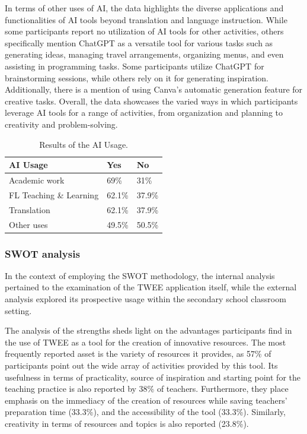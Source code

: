In terms of other uses of AI, the data highlights the diverse
applications and functionalities of AI tools beyond translation and
language instruction. While some participants report no utilization of
AI tools for other activities, others specifically mention ChatGPT as a
versatile tool for various tasks such as generating ideas, managing
travel arrangements, organizing menus, and even assisting in programming
tasks. Some participants utilize ChatGPT for brainstorming sessions,
while others rely on it for generating inspiration. Additionally, there
is a mention of using Canva's automatic generation
feature for creative tasks. Overall, the data showcases the varied ways
in which participants leverage AI tools for a range of activities, from
organization and planning to creativity and problem-solving.


\begin{table}[!htpb]
\centering
\caption{Results of the AI Usage.}
\label{table-01}
\begin{tabular}{lll}
\toprule
AI Usage & Yes & No \\
\midrule
Academic work & 69\% & 31\% \\
FL Teaching \& Learning & 62.1\% & 37.9\% \\
Translation & 62.1\% & 37.9\% \\
Other uses & 49.5\% & 50.5\% \\
\bottomrule 
\end{tabular}
\end{table}


\subsubsection{SWOT analysis}\label{sub-sub-sec-swotanalysis}

In the context of employing the SWOT methodology, the internal analysis
pertained to the examination of the TWEE application itself, while the
external analysis explored its prospective usage within the secondary
school classroom setting.

\label{sub-sub-sub-sec-strengths}

The analysis of the strengths sheds light on the advantages participants
find in the use of TWEE as a tool for the creation of innovative
resources. The most frequently reported asset is the variety of
resources it provides, as 57\% of participants point out the wide array
of activities provided by this tool. Its usefulness in terms of
practicality, source of inspiration and starting point for the teaching
practice is also reported by 38\% of teachers. Furthermore, they place
emphasis on the immediacy of the creation of resources while saving
teachers' preparation time (33.3\%), and the accessibility of the tool
(33.3\%). Similarly, creativity in terms of resources and topics is also
reported (23.8\%).

